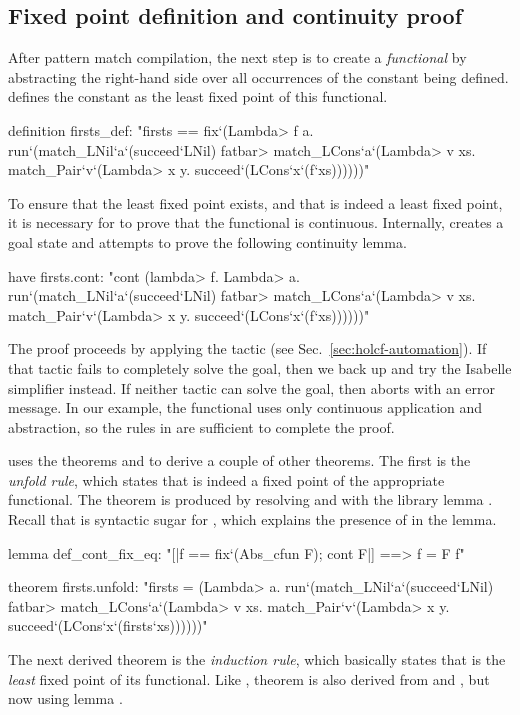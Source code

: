\subsection{Fixed point definition and continuity proof}
\label{sec:fixrec-impl-cont}

After pattern match compilation, the next step is to create a \emph{functional} by abstracting the right-hand side over all occurrences of the constant being defined. {\fixrec} defines the constant as the least fixed point of this functional.
%
\begin{isacode}
definition firsts_def:
  "firsts == fix`(\<Lambda> f a. run`(match_LNil`a`(succeed`LNil) \<fatbar>
    match_LCons`a`(\<Lambda> v xs. match_Pair`v`(\<Lambda> x y. succeed`(LCons`x`(f`xs))))))"
\end{isacode}
%
To ensure that the least fixed point exists, and that  is indeed a least fixed point, it is necessary for {\fixrec} to prove that the functional is continuous. Internally, {\fixrec} creates a goal state and attempts to prove the following continuity lemma.
%
\begin{isacode}
have firsts.cont:
  "cont (\<lambda> f. \<Lambda> a. run`(match_LNil`a`(succeed`LNil) \<fatbar>
    match_LCons`a`(\<Lambda> v xs. match_Pair`v`(\<Lambda> x y. succeed`(LCons`x`(f`xs))))))"
\end{isacode}
%
The proof proceeds by applying the tactic  (see Sec.~\ref{sec:holcf-automation}). If that tactic fails to completely solve the goal, then we back up and try the Isabelle simplifier instead. If neither tactic can solve the goal, then {\fixrec} aborts with an error message. In our example, the functional uses only continuous application and abstraction, so the rules in  are sufficient to complete the proof.

{\fixrec} uses the theorems  and  to derive a couple of other theorems. The first is the \emph{unfold rule}, which states that  is indeed a fixed point of the appropriate functional. The theorem  is produced by resolving  and  with the library lemma . Recall that  is syntactic sugar for , which explains the presence of  in the lemma.
%
\begin{isacode}
lemma def_cont_fix_eq:
  "[|f == fix`(Abs_cfun F); cont F|] ==> f = F f"
\end{isacode}
\unmedskip
{}
\begin{isacode}
theorem firsts.unfold:
  "firsts = (\<Lambda> a. run`(match_LNil`a`(succeed`LNil) \<fatbar>
    match_LCons`a`(\<Lambda> v xs. match_Pair`v`(\<Lambda> x y. succeed`(LCons`x`(firsts`xs))))))"
\end{isacode}
%
The next derived theorem is the \emph{induction rule}, which basically states that  is the \emph{least} fixed point of its functional. Like , theorem  is also derived from  and , but now using lemma .

